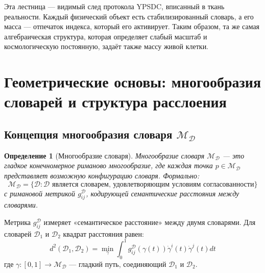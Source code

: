 \documentclass[11pt,a4paper]{article}
\newtheorem{definition}{Определение}
\begin{document}
Эта лестница — видимый след протокола YPSDC, вписанный в ткань реальности. Каждый физический объект есть стабилизированный словарь, а его масса — отпечаток индекса, который его активирует. Таким образом, та же самая алгебраическая структура, которая определяет слабый масштаб и космологическую постоянную, задаёт также массу живой клетки.

	\section{Геометрические основы: многообразия словарей и структура расслоения}
	\subsection{Концепция многообразия словаря $\mathcal{M}_{\mathcal{D}}$}
	
	\begin{definition}[Многообразие словаря]
		Многообразие словаря $\mathcal{M}_{\mathcal{D}}$ — это гладкое конечномерное риманово многообразие, где каждая точка $p \in \mathcal{M}_{\mathcal{D}}$ представляет возможную конфигурацию словаря. Формально:
		\begin{equation}
			\mathcal{M}_{\mathcal{D}} = \{ \mathcal{D} : \mathcal{D} \text{ является словарем, удовлетворяющим условиям согласованности} \}
		\end{equation}
		с римановой метрикой $g_{ij}^{\mathcal{D}}$, кодирующей семантические расстояния между словарями.
	\end{definition}
	
	Метрика $g_{ij}^{\mathcal{D}}$ измеряет «семантическое расстояние» между двумя словарями. Для словарей $\mathcal{D}_1$ и $\mathcal{D}_2$ квадрат расстояния равен:
	\begin{equation}
		d^2(\mathcal{D}_1, \mathcal{D}_2) = \min_{\gamma} \int_0^1 g_{ij}^{\mathcal{D}}(\gamma(t)) \dot{\gamma}^i(t) \dot{\gamma}^j(t) dt
	\end{equation}
	где $\gamma: [0,1] \to \mathcal{M}_{\mathcal{D}}$ — гладкий путь, соединяющий $\mathcal{D}_1$ и $\mathcal{D}_2$.
	
\end{document}
